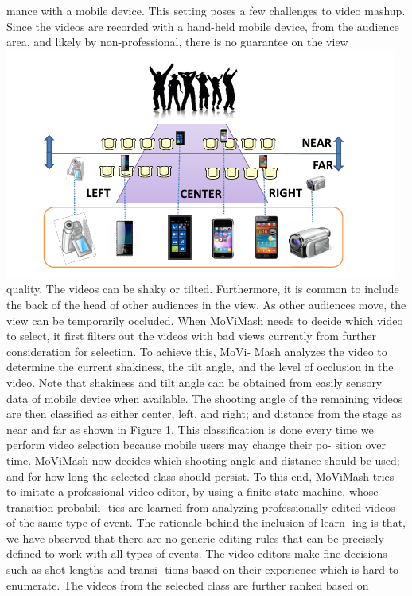 \documentclass{sig-alternate}
\begin{document}
mance with a mobile device. This setting poses a few challenges to
video mashup.
Since the videos are recorded with a hand-held mobile device,
from the audience area, and likely by non-professional, there is no
guarantee on the view \includegraphics[scale=1]{one.pdf}\\
quality. The videos can be shaky or tilted.
Furthermore, it is common to include the back of the head of other
audiences in the view. As other audiences move, the view can be
temporarily occluded. When MoViMash needs to decide which
video to select, it first filters out the videos with bad views currently
from further consideration for selection. To achieve this, MoVi-
Mash analyzes the video to determine the current shakiness, the tilt
angle, and the level of occlusion in the video. Note that shakiness
and tilt angle can be obtained from easily sensory data of mobile
device when available.
The shooting angle of the remaining videos are then classified as
either center, left, and right; and distance from the stage as near and
far as shown in Figure 1. This classification is done every time we
perform video selection because mobile users may change their po-
sition over time. MoViMash now decides which shooting angle and
distance should be used; and for how long the selected class should
persist. To this end, MoViMash tries to imitate a professional video
editor, by using a finite state machine, whose transition probabili-
ties are learned from analyzing professionally edited videos of the
same type of event. The rationale behind the inclusion of learn-
ing is that, we have observed that there are no generic editing rules
that can be precisely defined to work with all types of events. The
video editors make fine decisions such as shot lengths and transi-
tions based on their experience which is hard to enumerate.
The videos from the selected class are further ranked based on
\end{document}

